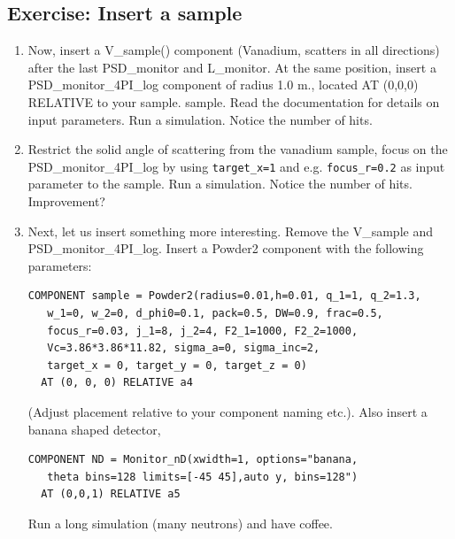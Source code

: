 \documentclass[a4paper]{article}
\begin{document}
\subsection{Exercise: Insert a sample}
\begin{enumerate}
\item{Now, insert a V\_sample() component (Vanadium, scatters in all
    directions) after the last PSD\_monitor and L\_monitor. At the
    same position, insert a PSD\_monitor\_4PI\_log component of radius
    1.0 m., located AT (0,0,0) RELATIVE to your sample.
    sample. Read the documentation for details on input parameters.
    Run a simulation. Notice the number of hits.}
\item{Restrict the solid angle of scattering from the vanadium sample,
  focus on the PSD\_monitor\_4PI\_log by using \texttt{target\_x=1} and
  e.g. \texttt{focus\_r=0.2} as input parameter to the sample. Run a
  simulation. Notice the number of hits. Improvement?}
\item{Next, let us insert something more interesting. Remove the
    V\_sample and  PSD\_monitor\_4PI\_log. Insert a Powder2 component
    with the following parameters:
    \begin{verbatim}
COMPONENT sample = Powder2(radius=0.01,h=0.01, q_1=1, q_2=1.3,
   w_1=0, w_2=0, d_phi0=0.1, pack=0.5, DW=0.9, frac=0.5, 
   focus_r=0.03, j_1=8, j_2=4, F2_1=1000, F2_2=1000, 
   Vc=3.86*3.86*11.82, sigma_a=0, sigma_inc=2,
   target_x = 0, target_y = 0, target_z = 0)
  AT (0, 0, 0) RELATIVE a4
\end{verbatim}
(Adjust placement relative to your component naming etc.). Also insert
  a banana shaped detector,
\begin{verbatim}
COMPONENT ND = Monitor_nD(xwidth=1, options="banana, 
   theta bins=128 limits=[-45 45],auto y, bins=128")
  AT (0,0,1) RELATIVE a5
\end{verbatim}
Run a long simulation (many neutrons) and have coffee.}
\end{enumerate}
\end{document}
